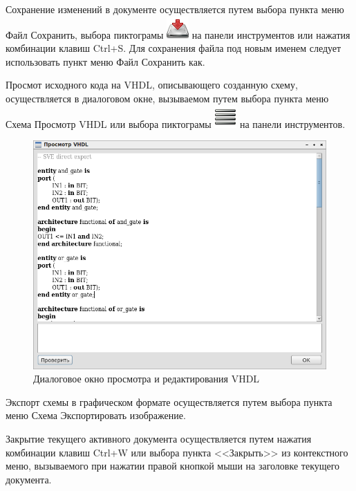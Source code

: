 Сохранение изменений в документе осуществляется путем выбора пункта меню Файл \rarr Сохранить, выбора пиктограмы \includegraphics[scale=0.5]{gui/icons/file-save.png} на панели инструментов или нажатия комбинации клавиш Ctrl+S.
Для сохранения файла под новым именем следует использовать пункт меню Файл \rarr Сохранить как.

Просмот исходного кода на VHDL, описывающего созданную схему, осуществляется в диалоговом окне, вызываемом путем выбора пункта меню Схема \rarr Просмотр VHDL или выбора пиктограмы \includegraphics[scale=0.5]{gui/icons/scheme-vhdl.png} на панели инструментов.
\begin{figure}[H]
  \centering
  \includegraphics[width=1\textwidth]{gui/vhdl-view.png}
  \caption{Диалоговое окно просмотра и редактирования VHDL}
  \label{fig:view-vhdl}
\end{figure}

Экспорт схемы в графическом формате осуществляется путем выбора пункта меню Схема \rarr Экспортировать изображение.

Закрытие текущего активного документа осуществляется путем нажатия комбинации клавиш Ctrl+W или выбора пункта <<Закрыть>> из контекстного меню, вызываемого при нажатии правой кнопкой мыши на заголовке текущего документа.

